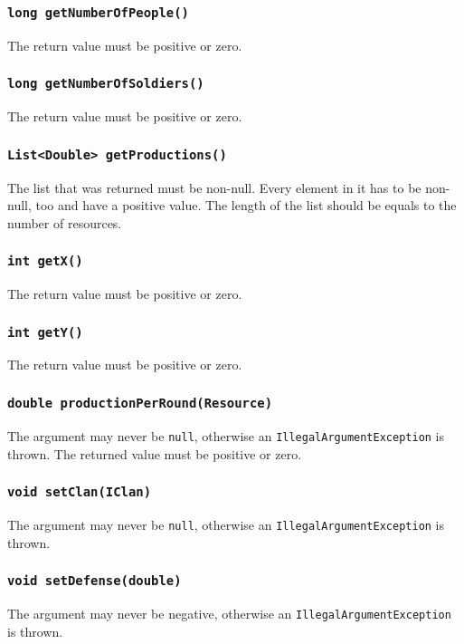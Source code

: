 \documentclass{article}
\begin{document}
\subsubsection{\texttt{long getNumberOfPeople()}}
The return value must be positive or zero.

\subsubsection{\texttt{long getNumberOfSoldiers()}}
The return value must be positive or zero.

\subsubsection{\texttt{List<Double> getProductions()}}
The list that was returned must be non-null. Every element in it has to be non-null,
too and have a positive value.
The length of the list should be equals to the number of resources.

\subsubsection{\texttt{int getX()}}
The return value must be positive or zero.

\subsubsection{\texttt{int getY()}}
The return value must be positive or zero.

\subsubsection{\texttt{double productionPerRound(Resource)}}
The argument may never be \texttt{null}, otherwise an \texttt{IllegalArgumentException} is thrown.
The returned value must be positive or zero.

\subsubsection{\texttt{void setClan(IClan)}}
The argument may never be \texttt{null}, otherwise an \texttt{IllegalArgumentException} is thrown.

\subsubsection{\texttt{void setDefense(double)}}
The argument may never be negative, otherwise an \texttt{IllegalArgumentException} is thrown.
\end{document}
